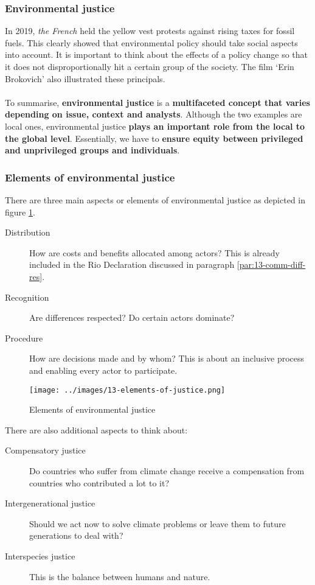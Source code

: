\documentclass[../summary.tex]{subfiles}
\begin{document}
\subsubsection{Environmental justice}
In 2019, \emph{the French} held the yellow vest protests against rising taxes for fossil fuels. This clearly showed that environmental policy should take social aspects into account. It is important to think about the effects of a policy change so that it does not disproportionally hit a certain group of the society. The film `Erin Brokovich' also illustrated these principals.
\\\\
To summarise, \textbf{environmental justice} is a \textbf{multifaceted concept that varies depending on issue, context and analysts}. Although the two examples are local ones, environmental justice \textbf{plays an important role from the local to the global level}. Essentially, we have to \textbf{ensure equity between privileged and unprivileged groups and individuals}.


\subsubsection{Elements of environmental justice}
There are three main aspects or elements of environmental justice as depicted in figure \ref{fig:elements-of-justice}.
\begin{description}
	\item[Distribution] How are costs and benefits allocated among actors? This is already included in the Rio Declaration discussed in paragraph \ref{par:13-comm-diff-res}.
	\item[Recognition] Are differences respected? Do certain actors dominate?
	\item[Procedure] How are decisions made and by whom? This is about an inclusive process and enabling every actor to participate.
\end{description}
\begin{figure}[h]
	\centering
	\texttt{[image: ../images/13-elements-of-justice.png]}
	\caption{Elements of environmental justice}
	\label{fig:elements-of-justice}
\end{figure}
There are also additional aspects to think about:
\begin{description}
	\item[Compensatory justice] Do countries who suffer from climate change receive a compensation from countries who contributed a lot to it?
	\item[Intergenerational justice] Should we act now to solve climate problems or leave them to future generations to deal with?
	\item[Interspecies justice] This is the balance between humans and nature.
\end{description}
\end{document}

